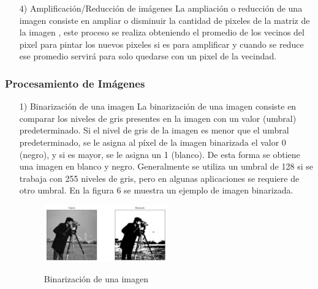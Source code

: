 \documentclass[a4paper, 12pt]{article}
\begin{document}
\begin{enumerate}
\item[4)] Amplificación/Reducción de imágenes 
\vskip 0.3cm
La ampliación o reducción de una imagen consiste en ampliar o disminuir la cantidad de pixeles de la matriz de la imagen , este proceso se realiza obteniendo el promedio de los vecinos del pixel para pintar los nuevos pixeles si es para amplificar y cuando se reduce ese promedio servirá para solo quedarse con un pixel de la vecindad. \par

\vskip 0.3cm



\end{enumerate}

\subsubsection{Procesamiento de Imágenes}
\begin{enumerate}
\item[1)] Binarización de una imagen
La binarización de una imagen consiste en comparar los niveles de gris presentes en la imagen con un valor (umbral) predeterminado. Si el nivel de gris de la imagen es menor que el umbral predeterminado, se le asigna al píxel de la imagen binarizada el valor 0 (negro), y si es mayor, se le asigna un 1 (blanco). De esta forma se obtiene una imagen en blanco y negro. Generalmente se utiliza un umbral de 128 si se trabaja con 255 niveles de gris, pero en algunas aplicaciones se requiere de otro umbral. En la figura 6 se muestra un ejemplo de imagen binarizada.\citep{elizondo2002fundamentos} \par 
\begin{figure}[ht]
\begin{center}
\includegraphics[width=0.5\textwidth]{binarizacion}
\end{center}
\begin{center}
\caption{\small{Binarización de una imagen}}
{\small{\cite{elizondo2002fundamentos}}}
\end{center}
\end{figure}
\vskip 4cm
\end{enumerate}
\end{document}
